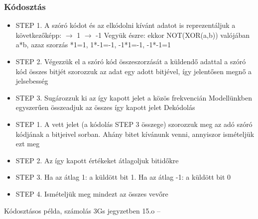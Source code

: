 \documentclass[10pt,a4paper]{article}
\begin{document}
	\subsubsection{Kódosztás}
	\begin{itemize}
	\item  STEP 1. A szóró kódot és az elkódolni kívánt adatot is reprezentáljuk a
	következőképp:
	 $\rightarrow$ 1
	 $\rightarrow$ -1
	\subitem  Vegyük észre: ekkor NOT(XOR(a,b)) valójában a*b, azaz szorzás
	*1=1, 1*-1=-1, -1*1=-1, -1*-1=1
	\item  STEP 2. Végezzük el a szóró kód összeszorzását a küldendő adattal
	\subitem  a szóró kód összes bitjét szorozzuk az adat egy adott bitjével, így jelentősen megnő
	a jelsebesség
	\item  STEP 3. Sugározzuk ki az így kapott jelet a közös frekvencián
	\subitem  Modellünkben egyszerűen összeadjuk az összes így kapott jelet
	\subitem  Dekódolás
	\item  STEP 1. A vett jelet (a kódolás STEP 3 összege) szorozzuk meg az adó szóró
	kódjának a bitjeivel sorban. Ahány bitet kívánunk venni, annyiszor ismételjük
	ezt meg
	\item  STEP 2. Az így kapott értékeket átlagoljuk bitidőkre
	\item  STEP 3. Ha az átlag 1: a küldött bit 1. Ha az átlag -1: a küldött bit 0
	\item  STEP 4. Ismételjük meg mindezt az összes vevőre
\end{itemize}
Kódosztásos példa, számolás 3Gs jegyzetben 15.o
-- 
\end{document}
